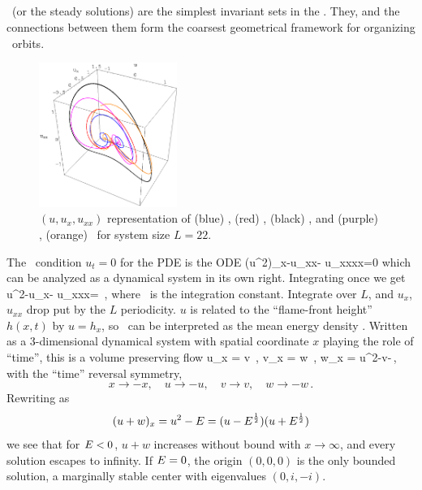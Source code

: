 \subsection{\Eqva} %
\label{sec:stks}


\Eqva\  (or the steady solutions)
are the simplest invariant sets in
the \statesp. They,  and
the connections between them form the
coarsest geometrical framework for organizing
\statesp\ orbits. %

\begin{figure}[t] \label{f:eqvSpatial}
\begin{center}
\includegraphics[width=0.4\textwidth]{figs/equilSpatial.eps}
\end{center}
\caption{
$(u,u_x,u_{xx})$ representation
of (blue) , (red) ,  (black)  \eqva,
 and (purple) , (orange)  \reqva\ for
system size $L=22$. %
        }
\end{figure}

The \eqv\ condition $u_t=0$ for the {\KSe} PDE 
is the ODE
\beq
(u^2)_x-u_{xx}- u_{xxxx}=0
which can be analyzed as a dynamical system in its own right.
Integrating once we get
\beq
u^2-u_x- u_{xxx}=\expctE
\,,
\label{eq:stdks}
\eeq
where \expctE\ is the integration constant.
Integrate over $L$, and $u_x$, $u_{xx}$ drop put by the
$L$ periodicity.
$u$ is related to the ``flame-front height'' $h(x,t)$ by
$u=h_x$, so \expctE\ can be interpreted as
the mean energy density .
Written as a 3-dimen\-si\-on\-al dynamical system
with spatial coordinate $x$ playing the role of ``time'',
this is a volume preserving flow
\beq
u_x = v \,,\qquad
v_x = w \,,\qquad
w_x = u^2-v-\expctE \,,
  \label{eq:3dks}
\eeq
with the ``time'' reversal symmetry,
\[
x \to -x,\quad u \to -u, \quad v \to v, \quad w \to -w \,.
\]
 Rewriting  as
\[
(u+w)_x=u^2-E
    =(u-E^{1\over 2}) (u+E^{1\over 2})
\]
we see that
for $E<0$, $u+w$ increases without bound with $x \to \infty$,
and every solution escapes to infinity.
If $E=0$, the origin $(0,0,0)$ is the
only bounded  solution, a marginally stable center with
eigenvalues $(0, i,-i)$.

